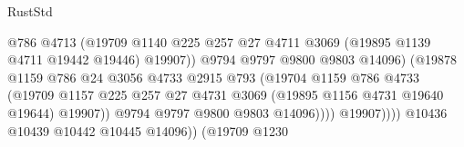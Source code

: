 \begin{lexlean}{RustStd}
\begin{coremodule}
                                                @786
                                                @4713
                                                (@19709
                                                  @1140
                                                  @225
                                                  @257
                                                  @27
                                                  @4711
                                                  @3069
                                                  (@19895 @1139 @4711 @19442 @19446)
                                                  @19907))
                                              @9794
                                              @9797
                                              @9800
                                              @9803
                                              @14096)
                                            (@19878
                                              @1159
                                              @786
                                              @24
                                              @3056
                                              @4733
                                              @2915
                                              @793
                                              (@19704
                                                @1159
                                                @786
                                                @4733
                                                (@19709
                                                  @1157
                                                  @225
                                                  @257
                                                  @27
                                                  @4731
                                                  @3069
                                                  (@19895 @1156 @4731 @19640 @19644)
                                                  @19907))
                                              @9794
                                              @9797
                                              @9800
                                              @9803
                                              @14096))))
                                      @19907))))
                              @10436
                              @10439
                              @10442
                              @10445
                              @14096))
                          (@19709
                            @1230

\end{coremodule}
\end{lexlean}
